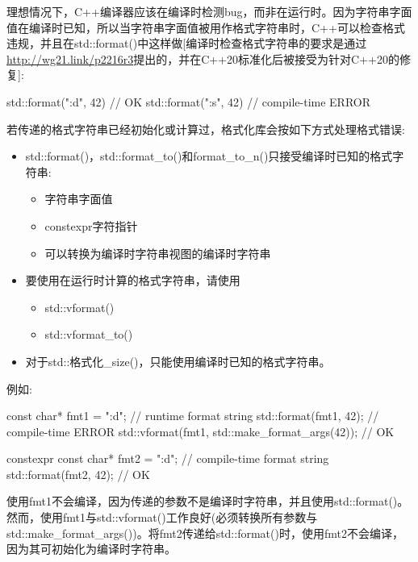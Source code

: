 理想情况下，C++编译器应该在编译时检测bug，而非在运行时。因为字符串字面值在编译时已知，所以当字符串字面值被用作格式字符串时，C++可以检查格式违规，并且在std::format()中这样做[编译时检查格式字符串的要求是通过\url{http://wg21.link/p2216r3}提出的，并在C++20标准化后被接受为针对C++20的修复]:

\begin{cpp}
std::format("{:d}", 42) // OK
std::format("{:s}", 42) // compile-time ERROR
\end{cpp}

若传递的格式字符串已经初始化或计算过，格式化库会按如下方式处理格式错误:

\begin{itemize}
\item
std::format()，std::format\_to()和format\_to\_n()只接受编译时已知的格式字符串:

\begin{itemize}
\item
字符串字面值

\item
constexpr字符指针

\item
可以转换为编译时字符串视图的编译时字符串
\end{itemize}

\item
要使用在运行时计算的格式字符串，请使用

\begin{itemize}
\item
std::vformat()

\item
std::vformat\_to()
\end{itemize}

\item
对于std::格式化\_size()，只能使用编译时已知的格式字符串。
\end{itemize}

例如:

\begin{cpp}
const char* fmt1 = "{:d}"; // runtime format string
std::format(fmt1, 42); // compile-time ERROR
std::vformat(fmt1, std::make_format_args(42)); // OK

constexpr const char* fmt2 = "{:d}"; // compile-time format string
std::format(fmt2, 42); // OK
\end{cpp}

使用fmt1不会编译，因为传递的参数不是编译时字符串，并且使用std::format()。然而，使用fmt1与std::vformat()工作良好(必须转换所有参数与std::make\_format\_args())。将fmt2传递给std::format()时，使用fmt2不会编译，因为其可初始化为编译时字符串。


